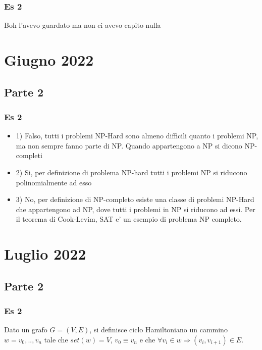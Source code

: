 \documentclass[a4paper,10pt,oneside]{book}
\begin{document}
\subsection{Es 2}

Boh l'avevo guardato ma non ci avevo capito nulla

\chapter{Giugno 2022}

\section{Parte 2}

\subsection{Es 2}

\begin{itemize}
    \item 1) Falso, tutti i problemi NP-Hard sono almeno difficili quanto i problemi NP, ma non sempre fanno parte di NP. Quando appartengono a NP si dicono NP-completi
    \item 2) Si, per definizione di problema NP-hard tutti i problemi NP si riducono polinomialmente ad esso
    \item 3) No, per definizione di NP-completo esiste una classe di problemi NP-Hard che appartengono ad NP, dove tutti i problemi in NP si riducono ad essi. Per il teorema di Cook-Levim, SAT e' un esempio di problema NP completo. 
\end{itemize}

\chapter{Luglio 2022}

\section{Parte 2}

\subsection{Es 2}

Dato un grafo $G = (V, E)$, si definisce ciclo Hamiltoniano un cammino $w = v_0,..,v_n$ tale che $set(w) = V$, $v_0 \equiv v_n$ e che $\forall v_i \in w \Rightarrow (v_i, v_{i+1}) \in E$.\\
\end{document}
